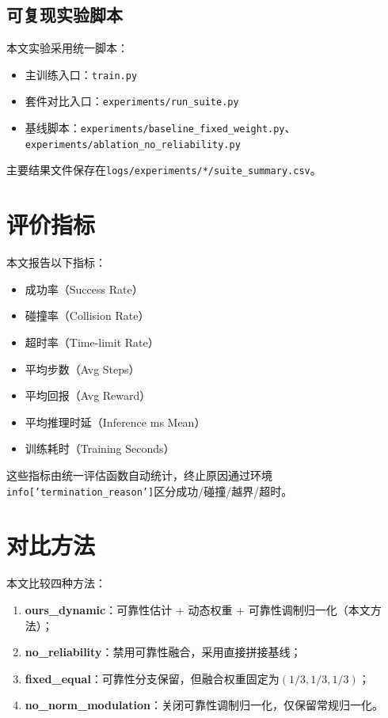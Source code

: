 \subsection{可复现实验脚本}
本文实验采用统一脚本：
\begin{itemize}
    \item 主训练入口：\texttt{train.py}
    \item 套件对比入口：\texttt{experiments/run\_suite.py}
    \item 基线脚本：\texttt{experiments/baseline\_fixed\_weight.py}、\texttt{experiments/ablation\_no\_reliability.py}
\end{itemize}
主要结果文件保存在\texttt{logs/experiments/*/suite\_summary.csv}。

\section{评价指标}
本文报告以下指标：
\begin{itemize}
    \item 成功率（Success Rate）
    \item 碰撞率（Collision Rate）
    \item 超时率（Time-limit Rate）
    \item 平均步数（Avg Steps）
    \item 平均回报（Avg Reward）
    \item 平均推理时延（Inference ms Mean）
    \item 训练耗时（Training Seconds）
\end{itemize}

这些指标由统一评估函数自动统计，终止原因通过环境\texttt{info['termination\_reason']}区分成功/碰撞/越界/超时。

\section{对比方法}
本文比较四种方法：
\begin{enumerate}
    \item \textbf{ours\_dynamic}：可靠性估计 + 动态权重 + 可靠性调制归一化（本文方法）；
    \item \textbf{no\_reliability}：禁用可靠性融合，采用直接拼接基线；
    \item \textbf{fixed\_equal}：可靠性分支保留，但融合权重固定为$(1/3,1/3,1/3)$；
    \item \textbf{no\_norm\_modulation}：关闭可靠性调制归一化，仅保留常规归一化。
\end{enumerate}

